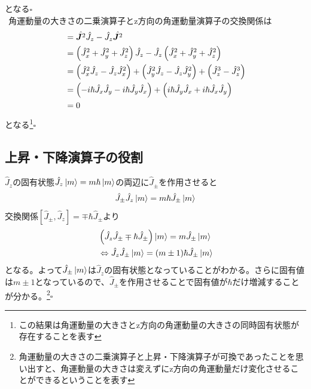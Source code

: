 \documentclass{jsarticle}  %
\numberwithin{equation}{section} %
\numberwithin{figure}{section}
\begin{document}
    となる$\square$\\
    $\ \ $角運動量の大きさの二乗演算子とz方向の角運動量演算子の交換関係は
    \begin{align}
        [\hat{\bm{J}^2},\hat{J}_z] &= \hat{\bm{J}^2} \hat{J}_z - \hat{J}_z \hat{\bm{J}^2} \notag \\
        &= \left( \hat{J}_x^2 + \hat{J}_y^2 + \hat{J}_z^2 \right) \hat{J}_z - \hat{J}_z\left( \hat{J}_x^2 + \hat{J}_y^2 + \hat{J}_z^2 \right) \notag \\
        &= \left( \hat{J}_x^2 \hat{J}_z - \hat{J}_z \hat{J}_x^2 \right) + \left( \hat{J}_y^2 \hat{J}_z - \hat{J}_z \hat{J}_y^2 \right) + \left( \hat{J}_z^3 - \hat{J}_z^3 \right) \notag \\
        &= \left( -i\hbar \hat{J}_x \hat{J}_y - i\hbar \hat{J}_y \hat{J}_x \right) + \left( i\hbar \hat{J}_y \hat{J}_x + i\hbar \hat{J}_x \hat{J}_y \right) \notag \\
        &= 0
    \end{align}
    となる\footnote{この結果は角運動量の大きさとz方向の角運動量の大きさの同時固有状態が存在することを表す}$\square$
\subsection{上昇・下降演算子の役割}
    $\hat{J}_z$の固有状態$\hat{J}_z \ket{m} = m\hbar \ket{m}$の両辺に$\hat{J}_{\pm}$を作用させると
    \begin{align}
        \hat{J}_{\pm} \hat{J}_z\ket{m} = m\hbar \hat{J}_{\pm}\ket{m}
    \end{align}
    交換関係$[\hat{J}_{\pm},\hat{J}_z] = \mp \hbar \hat{J}_{\pm}$より
    \begin{align}
        &\left( \hat{J}_z\hat{J}_{\pm} \mp \hbar \hat{J}_{\pm} \right)\ket{m} = m\hat{J}_{\pm}\ket{m} \notag \\
        &\Leftrightarrow \hat{J}_z\hat{J}_{\pm} \ket{m} = (m \pm 1)\hbar  \hat{J}_{\pm}\ket{m}
    \end{align}
    となる。よって$\hat{J}_{\pm}\ket{m}$は$\hat{J}_z$の固有状態となっていることがわかる。さらに固有値は$m\pm1$となっているので、$\hat{J}_{\pm}$を作用させることで固有値が$\hbar$だけ増減することが分かる。\footnote{角運動量の大きさの二乗演算子と上昇・下降演算子が可換であったことを思い出すと、角運動量の大きさは変えずにz方向の角運動量だけ変化させることができるということを表す}$\square$
\end{document}
